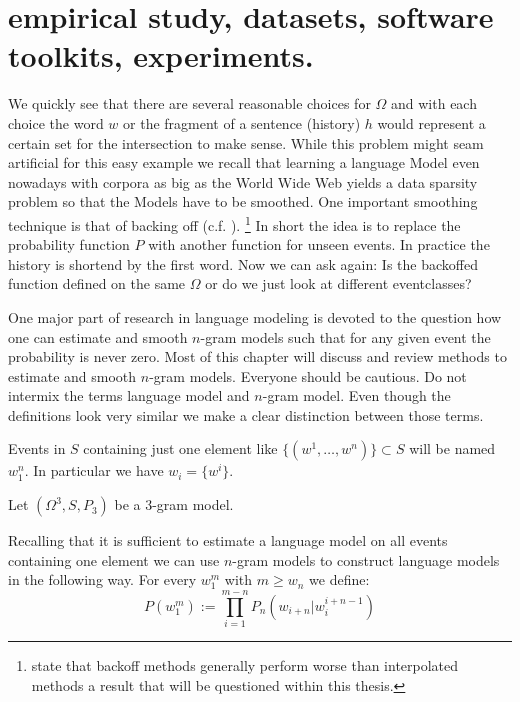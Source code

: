 \documentclass[•]{book}
\begin{document}
\chapter{empirical study, datasets, software toolkits, experiments.} 


We quickly see that there are several reasonable choices for $\Omega$ and with each choice the word $w$ or the fragment of a sentence (history) $h$ would represent a certain set for the intersection to make sense.
While this problem might seam artificial for this easy example we recall that learning a language Model even nowadays with corpora as big as the World Wide Web yields a data sparsity problem so that the Models have to be smoothed. 
One important smoothing technique is that of backing off (c.f. \cite{katz}\cite{kneser:ney:1994}). \footnote{\cite{chen:goodman} state that backoff methods generally perform worse than interpolated methods a result that will be questioned within this thesis.}
In short the idea is to replace the probability function $P$ with another function for unseen events. 
In practice the history is shortend by the first word. 
Now we can ask again: Is the backoffed function defined on the same $\Omega$ or do we just look at different eventclasses?



One major part of research in language modeling is devoted to the question how one can estimate and smooth $n$-gram models such that for any given event the probability is never zero. 
Most of this chapter will discuss and review methods to estimate and smooth $n$-gram models. 
Everyone should be cautious. 
Do not intermix the terms language model and $n$-gram model.
Even though the definitions look very similar we make a clear distinction between those terms. 

\begin{definition}
Events in  $S$ containing just one element like $\{(w^1,\dots,w^n)\}\subset S$ will be named $w_1^n$. 
In particular we have $w_i=\{w^i\}$.
\end{definition}
\begin{example}
Let $(\Omega^3,S,P_3)$ be a $3$-gram model. 
\end{example}

\begin{example}
Recalling that it is sufficient to estimate a language model on all events containing one element we can use $n$-gram models to construct language models in the following way. 
For every $w_1^m$ with $m\ge w_n$ we define:
\begin{equation}\label{eq:standardLanguageModel}
P(w_1^m):=\prod_{i=1}^{m-n}P_n(w_{i+n}|w_i^{i+n-1})
\end{equation}
\end{example}
\end{document}
